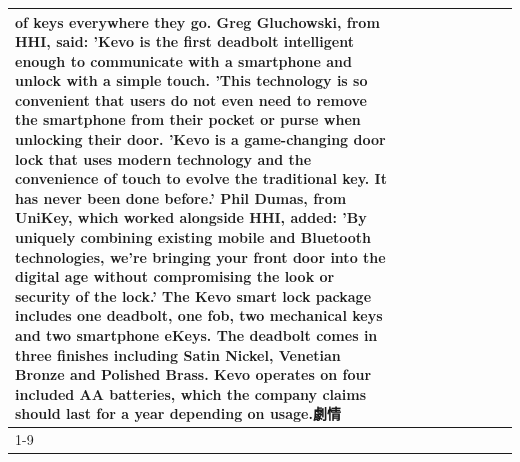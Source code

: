 \begin{table}[H]
\begin{tabular}{lllrlllll}
of keys everywhere they go. Greg Gluchowski, from HHI, said: 'Kevo is the first deadbolt intelligent enough to communicate with a smartphone and unlock with a simple touch. 'This technology is so convenient that users do not even need to remove the smartphone from their pocket or purse when unlocking their door. 'Kevo is a game-changing door lock that uses modern technology and the convenience of touch to evolve the traditional key. It has never been done before.' Phil Dumas, from UniKey, which worked alongside HHI, added: 'By uniquely combining existing mobile and Bluetooth technologies, we’re bringing your front door into the digital age without compromising the look or security of the lock.' The Kevo smart lock package includes one deadbolt, one fob, two mechanical keys and two smartphone eKeys. The deadbolt comes in three finishes including Satin Nickel, Venetian Bronze and Polished Brass. Kevo operates on four included AA batteries, which the company claims should last for a year depending on usage.劇情 \\
\cline{1-9}

\end{tabular}
\end{table}
